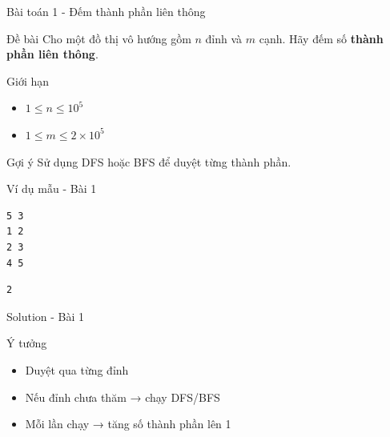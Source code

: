 \documentclass{beamer}
\begin{document}
\begin{frame}{Bài toán 1 - Đếm thành phần liên thông}

    \begin{block}{Đề bài}
        Cho một đồ thị vô hướng gồm $n$ đỉnh và $m$ cạnh.
        Hãy đếm số \textbf{thành phần liên thông}.
    \end{block}

    \pause

    \begin{block}{Giới hạn}
        \begin{itemize}
            \item $1 \le n \le 10^5$
            \item $1 \le m \le 2 \times 10^5$
        \end{itemize}
    \end{block}

    \pause

    \begin{alertblock}{Gợi ý}
        Sử dụng DFS hoặc BFS để duyệt từng thành phần.
    \end{alertblock}

\end{frame}

\begin{frame}[fragile]{Ví dụ mẫu - Bài 1}

    \begin{tcolorbox}[title=Input]
        \begin{verbatim}
5 3
1 2
2 3
4 5
\end{verbatim}
    \end{tcolorbox}

    \pause

    \begin{tcolorbox}[title=Output]
        \begin{verbatim}
2
\end{verbatim}
    \end{tcolorbox}

\end{frame}

\begin{frame}[fragile]{Solution - Bài 1}

    \begin{block}{Ý tưởng}
        \begin{itemize}
            \item Duyệt qua từng đỉnh
            \item Nếu đỉnh chưa thăm → chạy DFS/BFS
            \item Mỗi lần chạy → tăng số thành phần lên 1
        \end{itemize}
    \end{block}

\end{frame}
\end{document}
